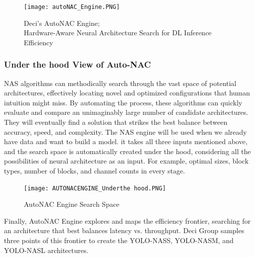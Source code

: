 \begin{figure}[H]
    \centering
    \texttt{[image: autoNAC\_Engine.PNG]}
    \caption{Deci's AutoNAC Engine; \\
    Hardware-Aware Neural Architecture Search for DL Inference Efficiency \cite{YOLo_NAS_Whitepaper_2022}\cite{yolo-nas-v8-sota}}
    \label{fig:AutoNAC Engine}
\end{figure}

\subsubsection{Under the hood View of Auto-NAC}
NAS algorithms can methodically search through the vast space of potential architectures, effectively locating novel and optimized configurations that human intuition might miss. By automating the process, these algorithms can quickly evaluate and compare an unimaginably large number of candidate architectures. They will eventually find a solution that strikes the best balance between accuracy, speed, and complexity. The NAS engine will be used when we already have data and want to build a model.
it takes all three inputs mentioned above, and the search space is automatically created under the hood, considering all the possibilities of neural architecture as an input. For example, optimal sizes, block types, number of blocks, and channel counts in every stage. \cite{yolo-nas-webinar} \cite{YOLo_NAS_Whitepaper_2022}
\begin{figure}[H]
    \centering
    \texttt{[image: AUTONACENGINE\_Underthe hood.PNG]}
    \caption{AutoNAC Engine Search Space \cite{yolo-nas-webinar}}
    \label{fig:autonac_under_the_hood}
\end{figure}
Finally, AutoNAC Engine explores and maps the efficiency frontier, searching for an architecture that best balances latency vs. throughput. Deci Group samples three points of this frontier to create the YOLO-NASS, YOLO-NASM, and YOLO-NASL architectures.
